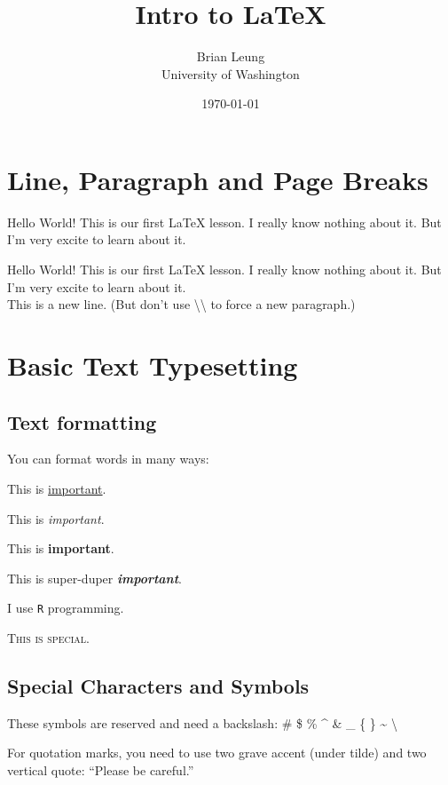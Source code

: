 \documentclass[12pt, a4paper]{article}
\title{Intro to \LaTeX{}}
\author{Brian Leung \\ University of Washington}
\date{\today}
\begin{document}
\maketitle


\section{Line, Paragraph and Page Breaks}
Hello World! This is our first \LaTeX{} lesson. I really know nothing about it. But I'm very excite to learn about it. 

Hello World! This is our first \LaTeX{} lesson. I really know nothing about it. But I'm very excite to learn about it. \\ %
This is a new line. (But don't use \textbackslash \textbackslash{} to force a new paragraph.)



\section{Basic Text Typesetting}

\subsection{Text formatting}
You can format words in many ways: 

This is \underline{important}. 

This is \textit{important}.

This is \textbf{important}.

This is super-duper \textbf{\textit{important}}.

I use \texttt{R} programming.

\textsc{This is special}.

\subsection{Special Characters and Symbols}
These symbols are reserved and need a backslash: \# \$ \% \^{} \& \_ \{ \} \~{} \textbackslash 

For quotation marks, you need to use two grave accent (under tilde) and two vertical quote: ``Please be careful.''
\end{document}
